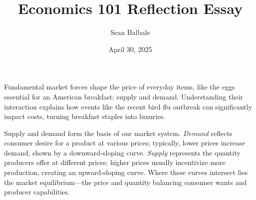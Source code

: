 \documentclass[12pt]{article}
\begin{document}
\makeatletter
\def\@maketitle{%
  \begin{center}%
    \let \footnote \thanks
    {\LARGE \@title \par}%
    {\large
      \@author \quad \@date}%
    \vskip 1em%
  \end{center}%
  \par
  \vskip 1.5em %
}
\makeatother

\begin{doublespace}

  \title{Economics 101 Reflection Essay}
  \author{Sean Balbale}
  \date{April 30, 2025}

  \maketitle

  Fundamental market forces shape the price of everyday items, like the eggs essential for an American breakfast: supply and demand. Understanding their interaction explains how events like the recent bird flu outbreak can significantly impact costs, turning breakfast staples into luxuries.

  Supply and demand form the basis of our market system. \emph{Demand} reflects consumer desire for a product at various prices; typically, lower prices increase demand, shown by a downward-sloping curve. \emph{Supply} represents the quantity producers offer at different prices; higher prices usually incentivize more production, creating an upward-sloping curve. Where these curves intersect lies the market equilibrium—the price and quantity balancing consumer wants and producer capabilities.


\end{doublespace}
\end{document}

